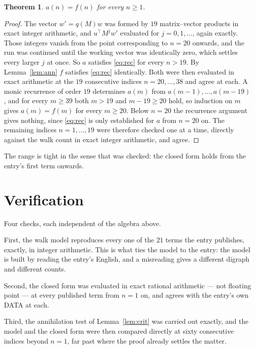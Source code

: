 \documentclass[11pt,a4paper]{article}
\theoremstyle{plain}
\newtheorem{theorem}{Theorem}
\theoremstyle{definition}
\begin{document}
\begin{theorem}
$a(n)=f(n)$ for every $n\ge1$.
\end{theorem}

\begin{proof}
The vector $w'=q(M)w$ was formed by $19$ matrix--vector products in exact integer
arithmetic, and $u^{\!\top}M^{j}w'$ evaluated for $j=0,1,\dots$, again exactly. Those integers
vanish from the point corresponding to $n=20$ onwards, and the run was continued until the
working vector was identically zero, which settles every larger $j$ at once. So $a$ satisfies
\eqref{eq:rec} for every $n>19$. By Lemma~\ref{lem:ann} $f$ satisfies \eqref{eq:rec}
identically. Both were then evaluated in exact arithmetic at the $19$ consecutive indices
$n=20,\dots,38$ and agree at each. A monic recurrence of order $19$
determines $a(m)$ from $a(m-1),\dots,a(m-19)$, and for every $m\ge39$ both
$m>19$ and $m-19\ge20$ hold, so induction on $m$ gives $a(m)=f(m)$ for every
$m\ge20$.
Below $n=20$ the recurrence argument gives nothing, since \eqref{eq:rec} is only
established for $a$ from $n=20$ on. The remaining indices $n=1,\dots,19$ were
therefore checked one at a time, directly against the walk count in exact integer arithmetic,
and agree.
\end{proof}

The range is tight in the sense that was checked: the closed form holds from the entry's first term onwards.

\section{Verification}

Four checks, each independent of the algebra above.

First, the walk model reproduces every one of the $21$ terms the entry publishes,
exactly, in integer arithmetic. This is what ties the model to the entry: the model is built
by reading the entry's English, and a misreading gives a different digraph and different
counts.

Second, the closed form was evaluated in exact rational arithmetic --- not floating point ---
at every published term from $n=1$ on, and agrees with the entry's own DATA at each.

Third, the annihilation test of Lemma~\ref{lem:crit} was carried out exactly, and the model
and the closed form were then compared directly at sixty consecutive indices beyond
$n=1$, far past where the proof already settles the matter.
\end{document}
